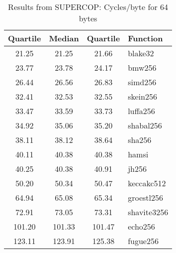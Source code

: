 \begin{table}
  \centering
  \caption{Results from SUPERCOP: Cycles/byte for 64 bytes}
  \begin{tabular}{ | c | c | c | l | }
    \hline
    \textbf{Quartile} & \textbf{Median} & \textbf{Quartile} & \textbf{Function} \\ \hline
    21.25 & 21.25 & 21.66 & blake32 \\ \hline
    23.77 & 23.78 & 24.17 & bmw256 \\ \hline
    26.44 & 26.56 & 26.83 & simd256 \\ \hline
    32.41 & 32.53 & 32.55 & skein256 \\ \hline
    33.47 & 33.59 & 33.73 & luffa256 \\ \hline
    34.92 & 35.06 & 35.20 & shabal256 \\ \hline
    38.11 & 38.12 & 38.64 & sha256 \\ \hline
    40.11 & 40.38 & 40.38 & hamsi \\ \hline
    40.25 & 40.38 & 40.91 & jh256 \\ \hline
    50.20 & 50.34 & 50.47 & keccakc512 \\ \hline
    64.94 & 65.08 & 65.34 & groestl256 \\ \hline
    72.91 & 73.05 & 73.31 & shavite3256 \\ \hline
    101.20 & 101.33 & 101.47 & echo256 \\ \hline
    123.11 & 123.91 & 125.38 & fugue256 \\ \hline
  \end{tabular}
  \label{tbl:supercop:64}
\end{table}
